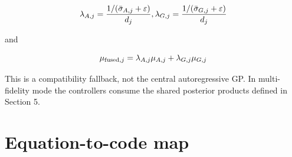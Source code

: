 \documentclass[11pt]{article}
\begin{document}
\begin{equation}
\lambda_{A,j} \\
= \\
\frac{ \\
1/(\bar\sigma_{A,j}+\varepsilon) \\
}{d_j}, \\
\qquad \\
\lambda_{G,j} \\
= \\
\frac{ \\
1/(\bar\sigma_{G,j}+\varepsilon) \\
}{d_j}
\end{equation}


and


\begin{equation}
\mu_{\mathrm{fused},j} \\
= \\
\lambda_{A,j}\mu_{A,j} \\
+ \\
\lambda_{G,j}\mu_{G,j}
\end{equation}


This is a compatibility fallback, not the central autoregressive GP. In multi-fidelity mode the controllers consume the shared posterior products defined in Section 5.


\section{Equation-to-code map}
\end{document}
